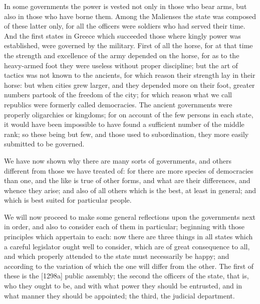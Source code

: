 In some governments the power is vested not only in those who bear arms,
but also in those who have borne them. Among the Malienses the state was
composed of these latter only, for all the officers were soldiers who had
served their time. And the first states in Greece which succeeded those
where kingly power was established, were governed by the military. First
of all the horse, for at that time the strength and excellence of the army
depended on the horse, for as to the heavy-armed foot they were useless
without proper discipline; but the art of tactics was not known to the
ancients, for which reason their strength lay in their horse: but when
cities grew larger, and they depended more on their foot, greater numbers
partook of the freedom of the city; for which reason what we call
republics were formerly called democracies. The ancient governments were
properly oligarchies or kingdoms; for on account of the few persons in
each state, it would have been impossible to have found a sufficient
number of the middle rank; so these being but few, and those used to
subordination, they more easily submitted to be governed.

We have now shown why there are many sorts of governments, and others
different from those we have treated of: for there are more species of
democracies than one, and the like is true of other forms, and what are
their differences, and whence they arise; and also of all others which is
the best, at least in general; and which is best suited for particular
people.


We will now proceed to make some general reflections upon the governments
next in order, and also to consider each of them in particular; beginning
with those principles which appertain to each: now there are three things
in all states which a careful legislator ought well to consider, which are
of great consequence to all, and which properly attended to the state must
necessarily be happy; and according to the variation of which the one will
differ from the other. The first of these is the [1298a] public assembly;
the second the officers of the state, that is, who they ought to be, and
with what power they should be entrusted, and in what manner they should
be appointed; the third, the judicial department.


